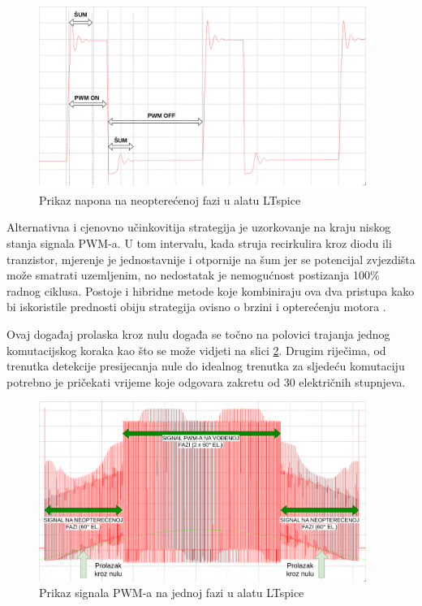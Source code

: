 \documentclass[diplomskirad]{fer}
\begin{document}
\begin{figure}[h!]
	\centering
	\includegraphics[width=0.95\textwidth]{Figures/pwm_sum.png}
	\caption{Prikaz napona na neopterećenoj fazi u alatu LTspice}
	\label{fig:pwm_sum}
\end{figure}

Alternativna i cjenovno učinkovitija strategija je uzorkovanje na kraju niskog
stanja signala PWM-a. U tom intervalu, kada struja recirkulira kroz diodu ili
tranzistor, mjerenje je jednostavnije i otpornije na šum jer se potencijal
zvjezdišta može smatrati uzemljenim, no nedostatak je nemogućnost postizanja
100\% radnog ciklusa. Postoje i hibridne metode koje kombiniraju ova dva
pristupa kako bi iskoristile prednosti obiju strategija ovisno o brzini i
opterećenju motora \cite{ST_AN1946}.

Ovaj događaj prolaska kroz nulu događa se točno na polovici trajanja jednog
komutacijskog koraka kao što se može vidjeti na slici \ref{fig:pwm_drive}.
Drugim riječima, od trenutka detekcije presijecanja nule do idealnog trenutka
za sljedeću komutaciju potrebno je pričekati vrijeme koje odgovara zakretu od
30 električnih stupnjeva.

\begin{figure}[h!]
	\centering
	\includegraphics[width=0.95\textwidth]{Figures/pwm_drive_deg.png}
	\caption{Prikaz signala PWM-a na jednoj fazi u alatu LTspice}
	\label{fig:pwm_drive}
\end{figure}
\end{document}
